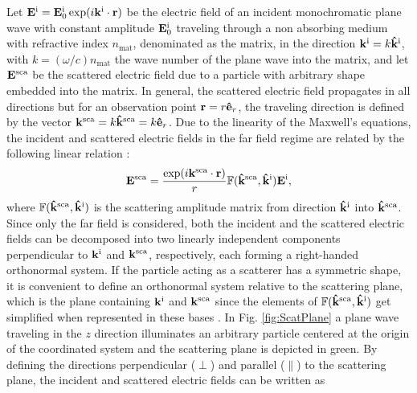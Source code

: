 
Let $\vb{E}^\text{i} = \vb{E}^\text{i}_0 \exp(i\vb{k}^\text{i}\cdot\vb{r})$ be the electric field of an incident monochromatic plane wave with constant amplitude $\vb{E}_0^\text{i}$  traveling through a non absorbing medium with refractive index $n_\text{mat}$, denominated as the matrix, in the direction $\vb{k}^\text{i} = k\vu{k}^\text{i}$, with $k = (\omega/c)n_\text{mat}$ the wave number of the plane wave into the matrix, and let $\vb{E}^\text{sca}$ be the scattered electric field due to a particle with arbitrary shape embedded into the matrix. In general, the scattered electric field propagates in all directions but for an observation point $\vb{r} = r\vu{e}_r$, the traveling direction is defined by the vector $\vb{k}^\text{sca} = k\vu{k}^\text{sca} = k\vu{e}_r$.  Due to the linearity of the Maxwell's equations,   the incident and scattered electric fields  in the far field regime are related by the following linear relation \cite{tsang_scattering_2000}:
%
%
 \begin{equation}
	\vb{E}^\text{sca} =   \frac{\exp(i\vb{k}^\text{sca}\cdot\vb{r})}{r} \mathbb{F}(\vu{k}^\text{sca}, \vu{k}^\text{i}) \vb{E}^\text{i},
 \label{eq:ScatAmpMat}
 \end{equation}
%
where $\mathbb{F}(\vu{k}^\text{sca}, \vu{k}^\text{i})$ is the scattering  amplitude matrix from direction $\vu{k}^\text{i}$ into $\vu{k}^\text{sca}$. Since only the far field is considered, both the incident and the scattered electric fields can be decomposed into two linearly independent components perpendicular to $\vb{k}^\text{i}$ and $\vb{k}^\text{sca}$, respectively, each forming a right-handed orthonormal system. If the particle acting as a scatterer has a symmetric shape, it is convenient to define an orthonormal system relative to the scattering plane, which is the plane containing $\vb{k}^\text{i}$ and $\vb{k}^\text{sca}$ since the elements of $\mathbb{F}(\vu{k}^\text{sca}, \vu{k}^\text{i})$ get simplified when represented in these bases \cite{tsang_scattering_2000}. In Fig. \ref{fig:ScatPlane} a plane wave traveling in the $z$ direction illuminates an arbitrary particle centered at the origin of the coordinated system and the scattering plane is depicted in green. By defining the directions perpendicular  ($\perp$) and parallel ($\parallel$) to the scattering plane,  the incident and scattered electric fields can be written as
